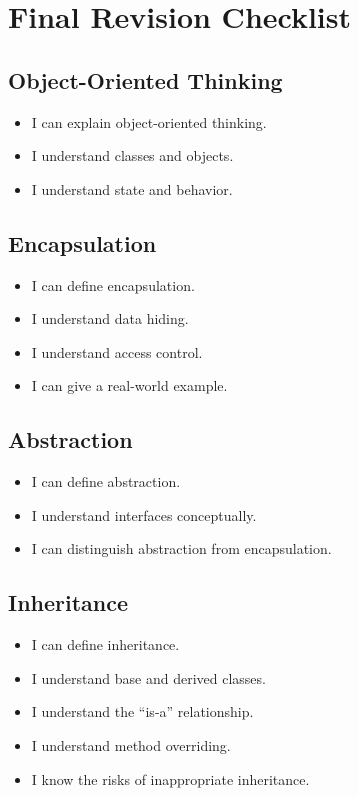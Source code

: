\documentclass[11pt,a4paper]{article}
\newcommand{\checkitem}{$\square$}
\begin{document}
\section{Final Revision Checklist}

\subsection*{Object-Oriented Thinking}

\begin{itemize}[label=\checkitem]
    \item I can explain object-oriented thinking.
    \item I understand classes and objects.
    \item I understand state and behavior.
\end{itemize}

\subsection*{Encapsulation}

\begin{itemize}[label=\checkitem]
    \item I can define encapsulation.
    \item I understand data hiding.
    \item I understand access control.
    \item I can give a real-world example.
\end{itemize}

\subsection*{Abstraction}

\begin{itemize}[label=\checkitem]
    \item I can define abstraction.
    \item I understand interfaces conceptually.
    \item I can distinguish abstraction from encapsulation.
\end{itemize}

\subsection*{Inheritance}

\begin{itemize}[label=\checkitem]
    \item I can define inheritance.
    \item I understand base and derived classes.
    \item I understand the ``is-a'' relationship.
    \item I understand method overriding.
    \item I know the risks of inappropriate inheritance.
\end{itemize}
\end{document}
